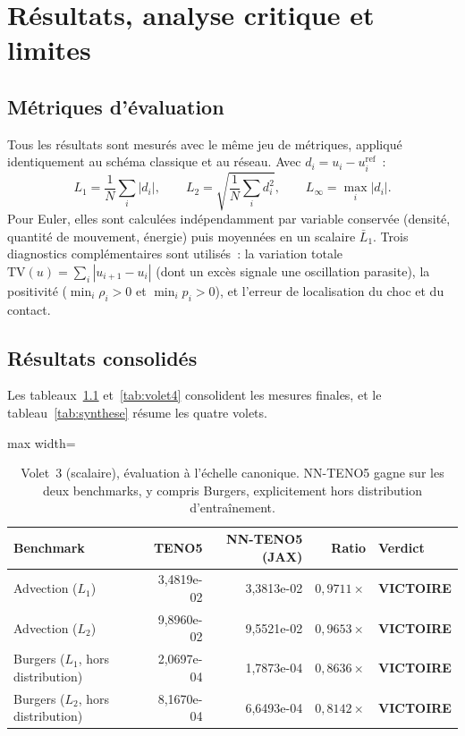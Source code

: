 \documentclass[12pt,a4paper,oneside]{report}
\begin{document}
\chapter{Résultats, analyse critique et limites}
\label{chap:resultats}

\section{Métriques d'évaluation}
\label{sec:metriques}

Tous les résultats sont mesurés avec le même jeu de métriques, appliqué
identiquement au schéma classique et au réseau. Avec $d_i = u_i -
u_i^{\text{ref}}$~:
\[
L_1 = \frac{1}{N}\sum_i |d_i|, \qquad
L_2 = \sqrt{\frac{1}{N}\sum_i d_i^2}, \qquad
L_\infty = \max_i |d_i|.
\]
Pour Euler, elles sont calculées indépendamment par variable conservée
(densité, quantité de mouvement, énergie) puis moyennées en un scalaire
$\bar L_1$. Trois diagnostics complémentaires sont utilisés~: la variation
totale $\mathrm{TV}(u)=\sum_i|u_{i+1}-u_i|$ (dont un excès signale une
oscillation parasite), la positivité ($\min_i \rho_i > 0$ et $\min_i p_i > 0$),
et l'erreur de localisation du choc et du contact.

\section{Résultats consolidés}
\label{sec:consolide}

Les tableaux~\ref{tab:volet3} et~\ref{tab:volet4} consolident les mesures
finales, et le tableau~\ref{tab:synthese} résume les quatre volets.

\begin{table}[H]
\centering
\begin{adjustbox}{max width=\textwidth}
\begin{tabular}{lrrrl}
\toprule
\textbf{Benchmark} & \textbf{TENO5} & \textbf{NN-TENO5 (JAX)} & \textbf{Ratio} & \textbf{Verdict} \\
\midrule
Advection ($L_1$) & 3{,}4819e-02 & 3{,}3813e-02 & $0{,}9711\times$ & \textbf{VICTOIRE} \\
\rowrule
Advection ($L_2$) & 9{,}8960e-02 & 9{,}5521e-02 & $0{,}9653\times$ & \textbf{VICTOIRE} \\
\rowrule
Burgers ($L_1$, hors distribution) & 2{,}0697e-04 & 1{,}7873e-04 & $0{,}8636\times$ & \textbf{VICTOIRE} \\
\rowrule
Burgers ($L_2$, hors distribution) & 8{,}1670e-04 & 6{,}6493e-04 & $0{,}8142\times$ & \textbf{VICTOIRE} \\
\bottomrule
\end{tabular}
\end{adjustbox}
\caption{Volet~3 (scalaire), évaluation à l'échelle canonique. NN-TENO5 gagne
sur les deux benchmarks, y compris Burgers, explicitement hors distribution
d'entraînement.}
\label{tab:volet3}
\end{table}
\end{document}
